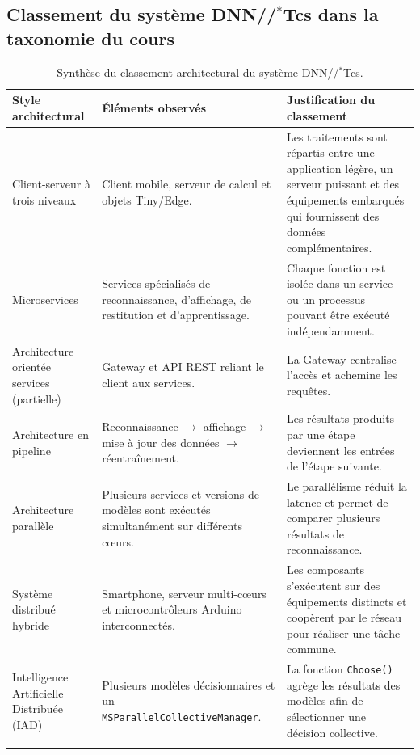 \documentclass[11pt,a4paper]{article}
\begin{document}
\subsection{Classement du système DNN//$^{*}$Tcs dans la taxonomie du cours}
\renewcommand{\arraystretch}{1.25}
\begin{longtable}{>{\raggedright\arraybackslash}p{3.1cm}
                  >{\raggedright\arraybackslash}p{4.7cm}
                  >{\raggedright\arraybackslash}p{5.5cm}}
\toprule
\textbf{Style architectural} & \textbf{Éléments observés} & \textbf{Justification du classement} \\
\midrule
\endhead
Client-serveur à trois niveaux
& Client mobile, serveur de calcul et objets Tiny/Edge.
& Les traitements sont répartis entre une application légère, un serveur puissant et des équipements embarqués qui fournissent des données complémentaires. \\
\midrule
Microservices
& Services spécialisés de reconnaissance, d'affichage, de restitution et d'apprentissage.
& Chaque fonction est isolée dans un service ou un processus pouvant être exécuté indépendamment. \\
\midrule
Architecture orientée services (partielle)
& Gateway et API REST reliant le client aux services.
& La Gateway centralise l'accès et achemine les requêtes. \\
\midrule
Architecture en pipeline
& Reconnaissance $\rightarrow$ affichage $\rightarrow$ mise à jour des données $\rightarrow$ réentraînement.
& Les résultats produits par une étape deviennent les entrées de l'étape suivante. \\
\midrule
Architecture parallèle
& Plusieurs services et versions de modèles sont exécutés simultanément sur différents cœurs.
& Le parallélisme réduit la latence et permet de comparer plusieurs résultats de reconnaissance. \\
\midrule
Système distribué hybride
& Smartphone, serveur multi-cœurs et microcontrôleurs Arduino interconnectés.
& Les composants s'exécutent sur des équipements distincts et coopèrent par le réseau pour réaliser une tâche commune. \\
\midrule
Intelligence Artificielle Distribuée (IAD)
& Plusieurs modèles décisionnaires et un \texttt{MSParallelCollectiveManager}.
& La fonction \texttt{Choose()} agrège les résultats des modèles afin de sélectionner une décision collective. \\
\bottomrule
\caption{Synthèse du classement architectural du système DNN//$^{*}$Tcs.}
\end{longtable}
\renewcommand{\arraystretch}{1}
\end{document}
